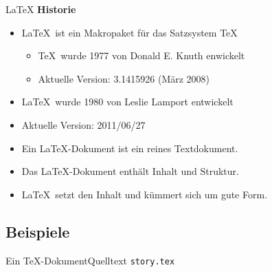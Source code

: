 
\begin{Frame}{\LaTeX}
  \textbf{\color{maincolor}Historie}
  \begin{itemize}
    \item \LaTeX\ ist ein Makropaket für das Satzsystem \TeX
      \begin{itemize}
        \item \TeX\ wurde 1977 von Donald E. Knuth enwickelt
        \item Aktuelle Version: 3.1415926 (März 2008)
      \end{itemize}
    \item \LaTeX\ wurde 1980 von Leslie Lamport entwickelt
    \item Aktuelle Version: 2011/06/27
  \end{itemize}

  \xxx
  \pause

  \begin{itemize}
    \item Ein \LaTeX-Dokument ist ein \alert{reines Textdokument}.
    \item Das \LaTeX-Dokument enthält \alert{Inhalt und Struktur}.
    \item \LaTeX\ setzt den Inhalt und kümmert sich um \alert{gute Form}.
  \end{itemize}
\end{Frame}

\subsection{Beispiele}

\begin{Frame}{Ein \TeX-Dokument}{Quelltext \texttt{story.tex}}
  
\end{Frame}

